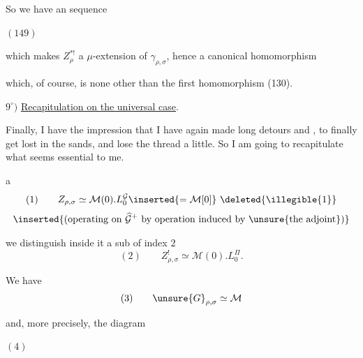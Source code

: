 
So we have an  sequence

\begin{samepage}
\( (149) \)\quad
{}
\end{samepage}

which makes $Z_\rho^{*!}$ a $\mu$-extension of $\gamma_{\rho,\sigma}$,
hence a canonical homomorphism


which, of course, is none other than the first homomorphism (130).

$9^\circ)$ \uline{Recapitulation on the universal case}.

Finally, I have the impression that I have again made long detours and
, to finally get lost in the sands, and lose
the thread a little. So I am going to recapitulate what seems essential to me.

\textcircled{a}
\[
\begin{gathered}(1)\qquad Z_{\rho,\sigma}\simeq\mathcal M(0).L_0^{\mathcal G}
\inserted{=\mathcal M[0]}\ \deleted{\illegible{1}}\\[3pt]\inserted{
\text{(operating on }\widehat{\mathcal G}^{+}\text{ by operation induced by }\unsure{\text{the adjoint}}\text{)}}
\end{gathered}\]

we distinguish inside it a sub of index $2$
\[
(2)\qquad Z_{\rho,\sigma}^{!}\simeq\mathcal M(0).L_0^{\Pi}.
\]


We have
\[
(3)\qquad \unsure{G}_{\rho,\sigma}\simeq\mathcal M
\]

and,  more precisely, the diagram

\begin{samepage}
\( (4) \)\quad
{}
\end{samepage}

